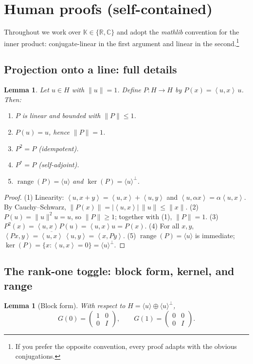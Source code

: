 \documentclass[11pt]{article}
\newtheorem{lemma}[theorem]{Lemma}
\theoremstyle{definition}
\newcommand{\K}{\mathbb{K}}
\newcommand{\R}{\mathbb{R}}
\newcommand{\C}{\mathbb{C}}
\newcommand{\ip}[2]{\left\langle #1,#2\right\rangle}
\DeclareMathOperator{\range}{range}
\DeclareMathOperator{\kerop}{ker}
\begin{document}
\appendix
\section{Human proofs (self-contained)}\label{sec:human-proofs}

Throughout we work over $\K\in\{\R,\C\}$ and adopt the \emph{mathlib} convention for the inner product: conjugate-linear in the first argument and linear in the second.\footnote{If you prefer the opposite convention, every proof adapts with the obvious conjugations.}

\subsection{Projection onto a line: full details}

\begin{lemma}\label{lem:proj-details}
Let $u\in H$ with $\|u\|=1$. Define $P:H\to H$ by $P(x)=\ip{u}{x}\,u$. Then:
\begin{enumerate}
\item $P$ is linear and bounded with $\|P\|\le 1$.
\item $P(u)=u$, hence $\|P\|=1$.
\item $P^2=P$ (idempotent).
\item $P^\ast=P$ (self-adjoint).
\item $\range(P)=\langle u\rangle$ and $\kerop(P)=\langle u\rangle^\perp$.
\end{enumerate}
\end{lemma}

\begin{proof}
(1) Linearity: $\ip{u}{x+y}=\ip{u}{x}+\ip{u}{y}$ and $\ip{u}{\alpha x}=\alpha\ip{u}{x}$. By Cauchy--Schwarz,
$\|P(x)\|=|\ip{u}{x}|\,\|u\|\le \|x\|$.
(2) $P(u)=\|u\|^2u=u$, so $\|P\|\ge 1$; together with (1), $\|P\|=1$.
(3) $P^2(x)=\ip{u}{x}P(u)=\ip{u}{x}u=P(x)$.
(4) For all $x,y$, $\ip{Px}{y}=\overline{\ip{u}{x}}\,\ip{u}{y}=\ip{x}{Py}$.
(5) $\range(P)=\langle u\rangle$ is immediate; $\kerop(P)=\{x:\ip{u}{x}=0\}=\langle u\rangle^\perp$.
\end{proof}

\subsection{The rank-one toggle: block form, kernel, and range}

\begin{lemma}[Block form]\label{lem:block-human}
With respect to $H=\langle u\rangle\oplus \langle u\rangle^\perp$,
\[
G(0)=\begin{pmatrix}1&0\\[2pt]0&I\end{pmatrix},\qquad
G(1)=\begin{pmatrix}0&0\\[2pt]0&I\end{pmatrix}.
\]
\end{lemma}
\end{document}
